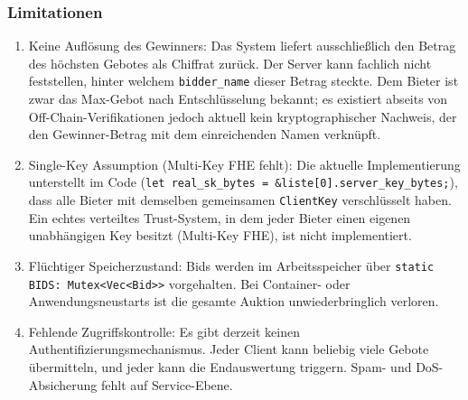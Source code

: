 \subsubsection{Limitationen}
\begin{enumerate}
    \item Keine Auflösung des Gewinners: Das System liefert ausschließlich den Betrag des höchsten Gebotes als Chiffrat zurück. Der Server kann fachlich nicht feststellen, hinter welchem \verb|bidder_name| dieser Betrag steckte. Dem Bieter ist zwar das Max-Gebot nach Entschlüsselung bekannt; es existiert abseits von Off-Chain-Verifikationen jedoch aktuell kein kryptographischer Nachweis, der den Gewinner-Betrag mit dem einreichenden Namen verknüpft.
    \item Single-Key Assumption (Multi-Key FHE fehlt): Die aktuelle Implementierung unterstellt im Code (\verb|let real_sk_bytes = &liste[0].server_key_bytes;|), dass alle Bieter mit demselben gemeinsamen \verb|ClientKey| verschlüsselt haben. Ein echtes verteiltes Trust-System, in dem jeder Bieter einen eigenen unabhängigen Key besitzt (Multi-Key FHE), ist nicht implementiert.
    \item Flüchtiger Speicherzustand: Bids werden im Arbeitsspeicher über \verb|static BIDS: Mutex<Vec<Bid>>| vorgehalten. Bei Container- oder Anwendungsneustarts ist die gesamte Auktion unwiederbringlich verloren.
    \item Fehlende Zugriffskontrolle: Es gibt derzeit keinen Authentifizierungsmechanismus. Jeder Client kann beliebig viele Gebote übermitteln, und jeder kann die Endauswertung triggern. Spam- und DoS-Absicherung fehlt auf Service-Ebene.
\end{enumerate}